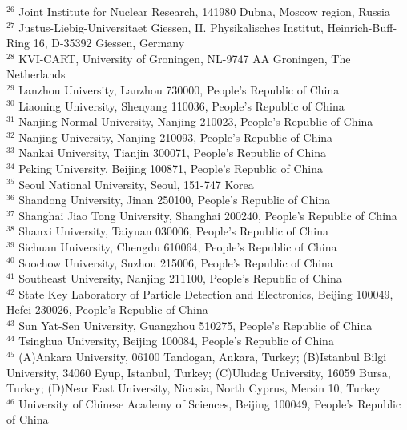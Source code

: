 {\begin{small}
{$^{26}$ Joint Institute for Nuclear Research, 141980 Dubna, Moscow region, Russia\\
$^{27}$ Justus-Liebig-Universitaet Giessen, II. Physikalisches Institut, Heinrich-Buff-Ring 16, D-35392 Giessen, Germany\\
$^{28}$ KVI-CART, University of Groningen, NL-9747 AA Groningen, The Netherlands\\
$^{29}$ Lanzhou University, Lanzhou 730000, People's Republic of China\\
$^{30}$ Liaoning University, Shenyang 110036, People's Republic of China\\
$^{31}$ Nanjing Normal University, Nanjing 210023, People's Republic of China\\
$^{32}$ Nanjing University, Nanjing 210093, People's Republic of China\\
$^{33}$ Nankai University, Tianjin 300071, People's Republic of China\\
$^{34}$ Peking University, Beijing 100871, People's Republic of China\\
$^{35}$ Seoul National University, Seoul, 151-747 Korea\\
$^{36}$ Shandong University, Jinan 250100, People's Republic of China\\
$^{37}$ Shanghai Jiao Tong University, Shanghai 200240, People's Republic of China\\
$^{38}$ Shanxi University, Taiyuan 030006, People's Republic of China\\
$^{39}$ Sichuan University, Chengdu 610064, People's Republic of China\\
$^{40}$ Soochow University, Suzhou 215006, People's Republic of China\\
$^{41}$ Southeast University, Nanjing 211100, People's Republic of China\\
$^{42}$ State Key Laboratory of Particle Detection and Electronics, Beijing 100049, Hefei 230026, People's Republic of China\\
$^{43}$ Sun Yat-Sen University, Guangzhou 510275, People's Republic of China\\
$^{44}$ Tsinghua University, Beijing 100084, People's Republic of China\\
$^{45}$ (A)Ankara University, 06100 Tandogan, Ankara, Turkey; (B)Istanbul Bilgi University, 34060 Eyup, Istanbul, Turkey; (C)Uludag University, 16059 Bursa, Turkey; (D)Near East University, Nicosia, North Cyprus, Mersin 10, Turkey\\
$^{46}$ University of Chinese Academy of Sciences, Beijing 100049, People's Republic of China\\
}
\end{small}}
